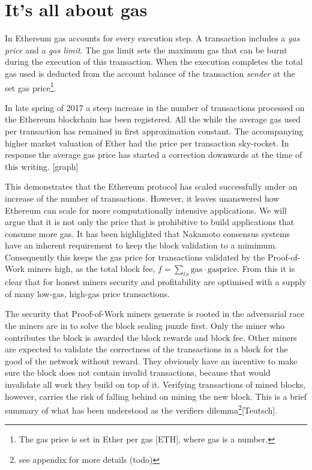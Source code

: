 \documentclass[twocolumn]{article}
\begin{document}
\section{It's all about gas}

In Ethereum gas accounts for every execution step.  A transaction includes a \emph{gas price} and a \emph{gas limit}.  The gas limit sets the maximum gas that can be burnt during the execution of this transaction.  When the execution completes the total gas used is deducted from the account balance of the transaction \emph{sender} at the set gas price\footnote{The gas price is set in Ether per gas [ETH], where gas is a number.}.

In late spring of 2017 a steep increase in the number of transactions processed on the Ethereum blockchain has been registered.  All the while the average gas used per transaction has remained in first approximation constant. The accompanying higher market valuation of Ether had the price per transaction sky-rocket. In response the average gas price has started a correction downwards at the time of this writing. [graph]

This demonstrates that the Ethereum protocol has scaled successfully under an increase of the number of transactions. However, it leaves unanswered how Ethereum can scale for more computationally intensive applications.  We will argue that it is not only the price that is prohibitive to build applications that consume more gas. It has been highlighted that Nakamoto consensus systems have an inherent requirement to keep the block validation to a mimimum.  Consequently this keeps the gas price for transactions validated by the Proof-of-Work miners high, as the total block fee, $f = \sum_{tx} \text{gas} \cdot \text{gasprice}$.  From this it is clear that for honest miners security and profitability are optimised with a supply of many low-gas, high-gas price transactions.

The security that Proof-of-Work miners generate is rooted in the adversarial race the miners are in to solve the block sealing puzzle first.  Only the miner who contributes the block is awarded the block rewards and block fee.  Other miners are expected to validate the correctness of the transactions in a block for the good of the network without reward.  They obviously have an incentive to make sure the block does not contain invalid transactions, because that would invalidate all work they build on top of it.  Verifying transactions of mined blocks, however, carries the risk of falling behind on mining the new block.  This is a brief summary of what has been understood as the verifiers dilemma\footnote{see appendix for more details (todo)}[Teutsch].
\end{document}
